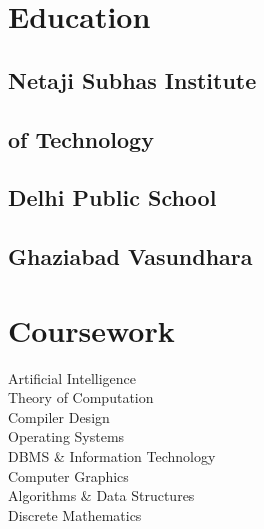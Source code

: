 \documentclass[]{deedy-resume-openfont}
\begin{document}
\begin{minipage}[t]{0.33\textwidth} 


\vspace{1pt}

\section{Education} 
\vspace{1pt}
\subsection{Netaji Subhas Institute} 
\subsection{of Technology}
\sectionsep

\subsection{Delhi Public School}
\subsection{Ghaziabad Vasundhara}
\vspace{1pt}
\vspace{1pt}
\sectionsep


\section{Coursework}
\vspace{2pt}
\normalsize
\vspace{1pt}
\hspace{3pt} Artificial Intelligence \\
\hspace{3pt} Theory of Computation \\
\hspace{3pt} Compiler Design \\
\hspace{3pt} Operating Systems \\
\hspace{3pt} DBMS \& Information Technology \\
\hspace{3pt} Computer Graphics \\
\hspace{3pt} Algorithms \& Data Structures \\
\hspace{3pt} Discrete Mathematics


\end{minipage}
\end{document}
